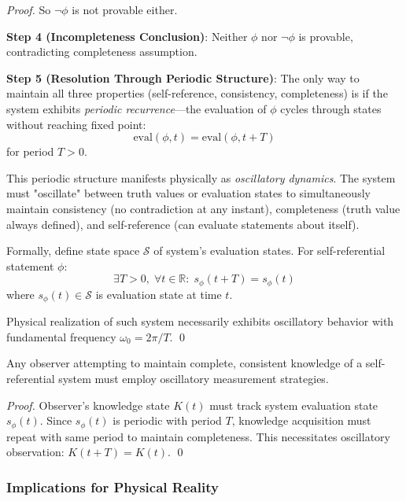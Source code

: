 \documentclass[11pt,onecolumn]{article}
\begin{document}
\begin{proof}
So $\neg \phi$ is not provable either.

\textbf{Step 4 (Incompleteness Conclusion)}: Neither $\phi$ nor $\neg \phi$ is provable, contradicting completeness assumption.

\textbf{Step 5 (Resolution Through Periodic Structure)}: The only way to maintain all three properties (self-reference, consistency, completeness) is if the system exhibits \textit{periodic recurrence}---the evaluation of $\phi$ cycles through states without reaching fixed point:
\begin{equation}
\text{eval}(\phi, t) = \text{eval}(\phi, t + T)
\end{equation}
for period $T > 0$.

This periodic structure manifests physically as \textit{oscillatory dynamics}. The system must "oscillate" between truth values or evaluation states to simultaneously maintain consistency (no contradiction at any instant), completeness (truth value always defined), and self-reference (can evaluate statements about itself).

Formally, define state space $\mathcal{S}$ of system's evaluation states. For self-referential statement $\phi$:
\begin{equation}
\exists T > 0, \; \forall t \in \mathbb{R}: \; s_{\phi}(t + T) = s_{\phi}(t)
\end{equation}
where $s_{\phi}(t) \in \mathcal{S}$ is evaluation state at time $t$.

Physical realization of such system necessarily exhibits oscillatory behavior with fundamental frequency $\omega_0 = 2\pi / T$. \qed
\end{proof}

\begin{corollary}
Any observer attempting to maintain complete, consistent knowledge of a self-referential system must employ oscillatory measurement strategies.
\end{corollary}

\begin{proof}
Observer's knowledge state $K(t)$ must track system evaluation state $s_{\phi}(t)$. Since $s_{\phi}(t)$ is periodic with period $T$, knowledge acquisition must repeat with same period to maintain completeness. This necessitates oscillatory observation: $K(t+T) = K(t)$. \qed
\end{proof}

\subsubsection{Implications for Physical Reality}
\end{document}
